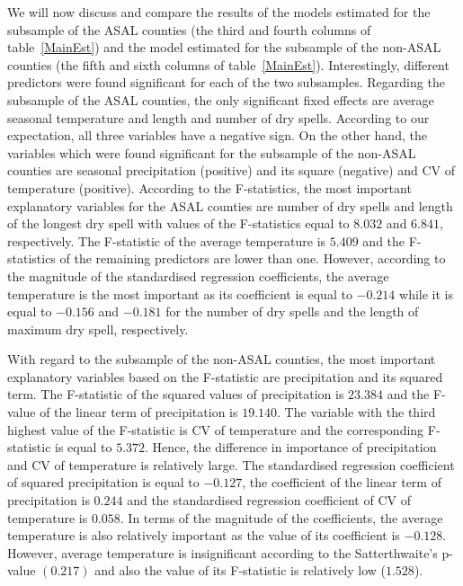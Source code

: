 \documentclass[12pt]{iopart}
\begin{document}
We will now discuss and compare the results of the models estimated for the subsample of the ASAL counties (the third and fourth columns of table~\ref{MainEst}) and the model estimated for the subsample of the non-ASAL counties (the fifth and sixth columns of table~\ref{MainEst}). Interestingly, different predictors were found significant for each of the two subsamples. Regarding the subsample of the ASAL counties, the only significant fixed effects are average seasonal temperature and length and number of dry spells. According to our expectation, all three variables have a negative sign. On the other hand, the variables which were found significant for the subsample of the non-ASAL counties are seasonal precipitation (positive) and its square (negative) and CV of temperature (positive). According to the F-statistics, the most important explanatory variables for the ASAL counties are number of dry spells and length of the longest dry spell with values of the F-statistics equal to $8.032$ and $6.841$, respectively. The F-statistic of the average temperature is $5.409$ and the F-statistics of the remaining predictors are lower than one. However, according to the magnitude of the standardised regression coefficients, the average temperature is the most important as its coefficient is equal to $-0.214$ while it is equal to $-0.156$ and $-0.181$ for the number of dry spells and the length of maximum dry spell, respectively.


With regard to the subsample of the non-ASAL counties, the most important explanatory variables based on the F-statistic are precipitation and its squared term. The F-statistic of the squared values of precipitation is $23.384$ and the F-value of the linear term of precipitation is $19.140$. The variable with the third highest value of the F-statistic is CV of temperature and the corresponding F-statistic is equal to $5.372$. Hence, the difference in importance of precipitation and CV of temperature is relatively large. The standardised regression coefficient of squared precipitation is equal to $-0.127$, the coefficient of the linear term of precipitation is $0.244$ and the standardised regression coefficient of CV of temperature is $0.058$. In terms of the magnitude of the coefficients, the average temperature is also relatively important as the value of its coefficient is $-0.128$. However, average temperature is insignificant according to the Satterthwaite's p-value $(0.217)$ and also the value of its F-statistic is relatively low ($1.528$).
\end{document}
